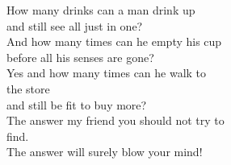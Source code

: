 
How many drinks can a man drink up \\ and still see all just in one? \\ And how many times can he empty his cup \\ before all his senses are gone? \\ Yes and how many times can he walk to \\ the store \\ and still be fit to buy more? \\ The answer my friend you should not try to \\ find. \\ The answer will surely blow your mind!